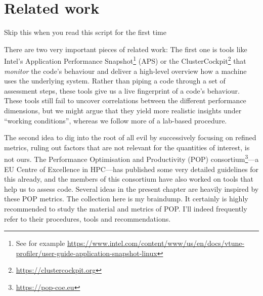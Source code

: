 \chapter{Related work}

Skip this when you read this script for the first time


There are two very important pieces of related work:
The first one is tools like Intel's Application Performance Snapshot\footnote{See for example \url{https://www.intel.com/content/www/us/en/docs/vtune-profiler/user-guide-application-snapshot-linux}} (APS) or the ClusterCockpit\footnote{\url{https://clustercockpit.org}} that \emph{monitor} the code's behaviour and deliver a high-level overview how a machine uses the underlying system.
Rather than piping a code through a set of assessment steps, these tools give us a live fingerprint of a code's behaviour.
These tools still fail to uncover correlations between the different performance dimensions, but we might argue that they yield more realistic insights under ``working conditions'', whereas we follow more of a lab-based procedure.


The second idea to dig into the root of all evil by successively focusing on refined metrics, ruling out factors that are not relevant for the quantities of interest, is not ours.
The Performance Optimisation and Productivity (POP) consortium\footnote{\url{https://pop-coe.eu}}---a EU Centre of Excellence in HPC---has published some very detailed guidelines for this already, and the members of this consortium have also worked on tools that help us to assess code.
Several ideas in the present chapter are heavily inspired by these POP metrics.
The collection here is my braindump.
It certainly is highly recommended to study the material and metrics of POP.
I'll indeed frequently refer to their procedures, tools and recommendations.

